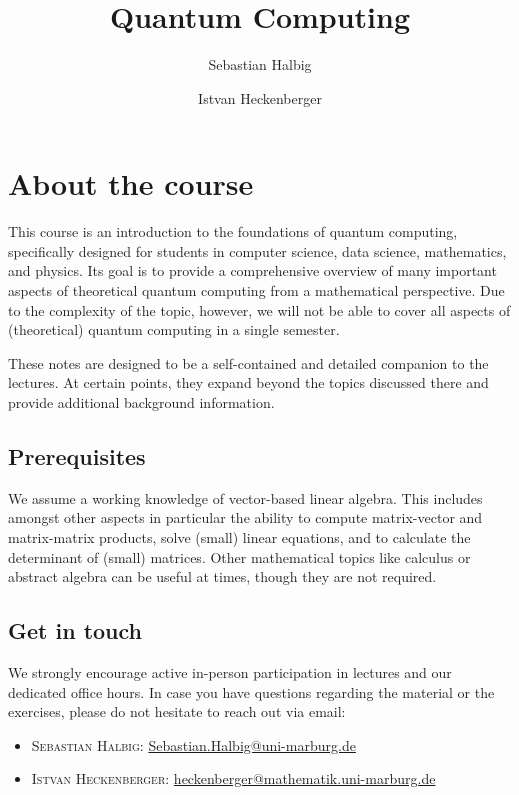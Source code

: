 \documentclass[a4paper,oneside, 12pt]{amsart}
\title{Quantum Computing}
\author{Sebastian Halbig}
\author{Istvan Heckenberger}
\begin{document}
\maketitle
\tableofcontents

\cleardoublepage

\section*{About the course}
This course is an introduction to the foundations of quantum computing, specifically designed for students in computer science, data science, mathematics, and physics.
Its goal is to provide a comprehensive overview of many important aspects of theoretical quantum computing from a mathematical perspective.
Due to the complexity of the topic, however, we will not be able to cover all aspects of (theoretical) quantum computing in a single semester.

These notes are designed to be a  self-contained and detailed companion to the lectures.
At certain points, they expand beyond the topics discussed there and provide additional background information.

\subsection*{Prerequisites}
We assume a working knowledge of vector-based linear algebra.
This includes amongst other aspects in particular the ability to compute matrix-vector and matrix-matrix products, solve (small) linear equations, and to calculate the determinant of (small) matrices.
Other mathematical topics like calculus or abstract algebra can be useful at times, though they are not required.

\subsection*{Get in touch}
We strongly encourage active in-person participation in lectures and our dedicated office hours.
In case you have questions regarding the material or the exercises, please do not hesitate to reach out via email:
\begin{itemize}
  \item \textsc{Sebastian Halbig:} \url{Sebastian.Halbig@uni-marburg.de}
  \item \textsc{Istvan Heckenberger:} \url{heckenberger@mathematik.uni-marburg.de}
\end{itemize}
\end{document}
